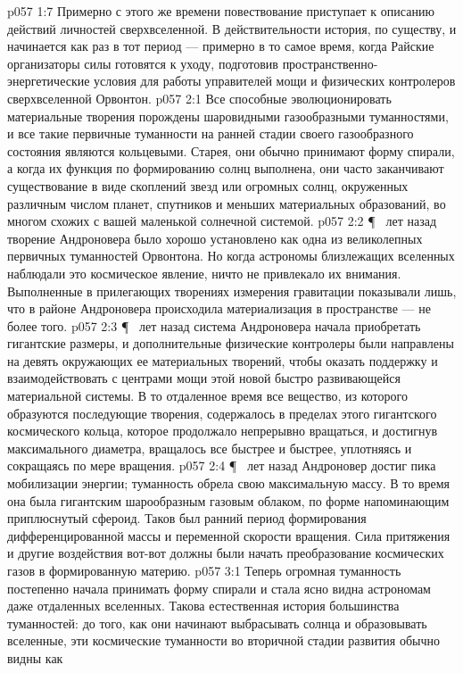 \vs p057 1:7 Примерно с этого же времени повествование приступает к описанию действий личностей сверхвселенной. В действительности история, по существу, и начинается как раз в тот период --- примерно в то самое время, когда Райские организаторы силы готовятся к уходу, подготовив пространственно\hyp{}энергетические условия для работы управителей мощи и физических контролеров сверхвселенной Орвонтон.
\vs p057 2:1 Все способные эволюционировать материальные творения порождены шаровидными газообразными туманностями, и все такие первичные туманности на ранней стадии своего газообразного состояния являются кольцевыми. Старея, они обычно принимают форму спирали, а когда их функция по формированию солнц выполнена, они часто заканчивают существование в виде скоплений звезд или огромных солнц, окруженных различным числом планет, спутников и меньших материальных образований, во многом схожих с вашей маленькой солнечной системой.
\vs p057 2:2 \P\  лет назад творение Андроновера было хорошо установлено как одна из великолепных первичных туманностей Орвонтона. Но когда астрономы близлежащих вселенных наблюдали это космическое явление, ничто не привлекало их внимания. Выполненные в прилегающих творениях измерения гравитации показывали лишь, что в районе Андроновера происходила материализация в пространстве --- не более того.
\vs p057 2:3 \P\  лет назад система Андроновера начала приобретать гигантские размеры, и дополнительные физические контролеры были направлены на девять окружающих ее материальных творений, чтобы оказать поддержку и взаимодействовать с центрами мощи этой новой быстро развивающейся материальной системы. В то отдаленное время все вещество, из которого образуются последующие творения, содержалось в пределах этого гигантского космического кольца, которое продолжало непрерывно вращаться, и достигнув максимального диаметра, вращалось все быстрее и быстрее, уплотняясь и сокращаясь по мере вращения.
\vs p057 2:4 \P\  лет назад Андроновер достиг пика мобилизации энергии; туманность обрела свою максимальную массу. В то время она была гигантским шарообразным газовым облаком, по форме напоминающим приплюснутый сфероид. Таков был ранний период формирования дифференцированной массы и переменной скорости вращения. Сила притяжения и другие воздействия вот\hyp{}вот должны были начать преобразование космических газов в формированную материю.
\vs p057 3:1 Теперь огромная туманность постепенно начала принимать форму спирали и стала ясно видна астрономам даже отдаленных вселенных. Такова естественная история большинства туманностей: до того, как они начинают выбрасывать солнца и образовывать вселенные, эти космические туманности во вторичной стадии развития обычно видны как 
